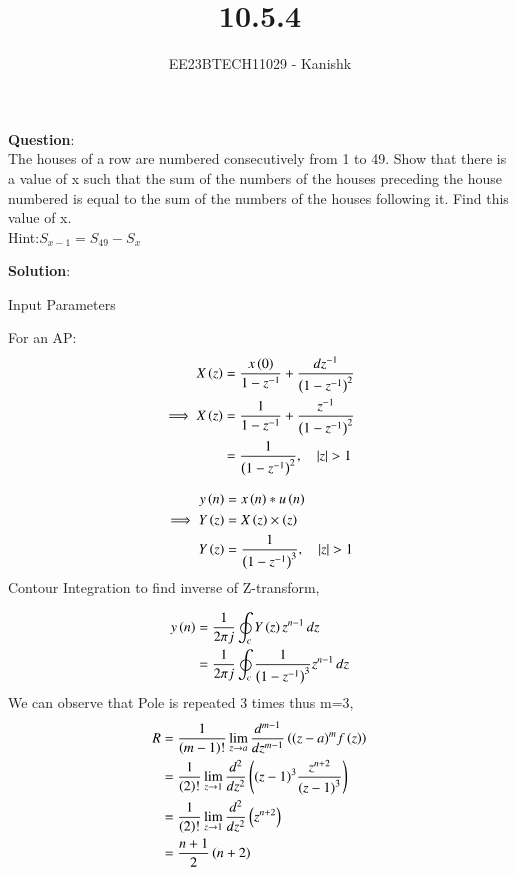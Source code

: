 \documentclass[journal,12pt,twocolumn]{IEEEtran}
\theoremstyle{remark}
\begin{document}

\vspace{3cm}

\title{10.5.4}
\author{EE23BTECH11029 - Kanishk}
\maketitle
\newpage

\bigskip

\renewcommand{\thefigure}{\theenumi}
\renewcommand{\thetable}{\theenumi}
\textbf{Question}:\\
The houses of a row are numbered consecutively from 1 to 49. Show that there is a value
of x such that the sum of the numbers of the houses preceding the house numbered is equal to the sum of the numbers of the houses following it. Find this value of x.\\
Hint:$ S_{x-1}=S_{49}-S_x$

\textbf{Solution}:\\

\begin{table}[ht]
    \centering
    \def\arraystretch{1.5}
    
   \caption{Input Parameters}
   \label{tab:10.5.4}
\end{table}


For an AP:
\begin{align}
X\left(z\right)&=\frac{x\left(0\right)}{1-z^{-1}}+ \frac{dz^{-1}}{\left(1-z^{-1}\right)^{2}}\\
\implies X\left(z\right)&=\frac{1}{1-z^{-1}}+ \frac{z^{-1}}{\left(1-z^{-1}\right)^{2}}\\
&=\frac{1}{\left(1-z^{-1}\right)^{2}},\quad \left\vert z\right\vert > 1
\end{align}

\begin{align}
y\left(n\right)&=x\left(n\right)*u\left(n\right)\\
\implies Y\left(z\right)&=X\left(z\right)\times \left(z\right)\\
Y\left(z\right)&= \frac{1}{\left(1-z^{-1}\right)^{3}},\quad \left\vert z\right\vert>1
\end{align}
Contour Integration to find inverse of Z-transform,

\begin{align}
y\left(n\right)&=\frac{1}{2\pi j}\oint_c Y\left(z\right)z^{n-1} \,dz\\
&=\frac{1}{2\pi j} \oint_c \frac{1}{\left(1-z^{-1}\right)^{3}}z^{n-1} \,dz
\end{align}
We can observe that Pole is repeated 3 times thus m=3,
\begin{align}
R&=\frac{1}{\left(m-1\right)!}\lim\limits_{z\to a}\frac{d^{m-1}}{dz^{m-1}}\left({(z-a)}^{m}f\left(z\right)\right)  \\
&=\frac{1}{\left(2\right)!}\lim\limits_{z\to 1}\frac{d^{2}}{dz^{2}}\left({(z-1)}^{3}\frac{z^{n+2}}{{(z-1)}^3}\right)\\
&=\frac{1}{\left(2\right)!}\lim\limits_{z\to 1}\frac{d^{2}}{dz^{2}}\left(z^{n+2}\right)\\
&=\frac{n+1}{2}\left(n+2\right)
\end{align}
\end{document}
